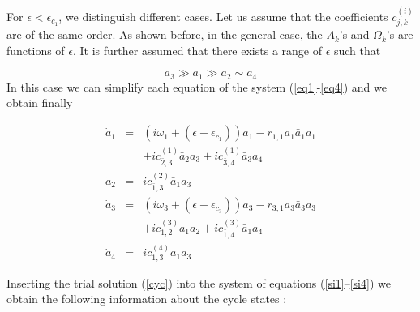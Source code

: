 For $\epsilon<\epsilon_{c_1}$, we distinguish different cases.
Let us assume that the coefficients $c^{(i)}_{j,k}$ are of the same order.
As shown before, in the general case, the $A_k$'s and $\Omega_k$'s
are functions of $\epsilon$.
It is further assumed that there exists a range of
$\epsilon$ such that 

\begin{equation}\label{order}
a_3\gg a_1 \gg a_2 \sim a_4
\end{equation}
In this case we can simplify each equation of the system 
(\ref{eq1}-\ref{eq4})
and we obtain finally



\begin{eqnarray}
\dot{a}_1&=&(i\omega_1+(\epsilon-\epsilon_{c_1}))a_1-r_{1,1}a_1\bar{a}_1a_1\nonumber\\
&&+ic^{(1)}_{\bar{2},3}\bar{a}_2{a}_3+ic^{(1)}_{\bar{3},4}\bar{a}_3a_4\label{si1}\\
\dot{a}_2&=&ic^{(2)}_{\bar{1},3}\bar{a}_1{a}_3\label{si2}\\
\dot{a}_3&=&(i\omega_3+(\epsilon-\epsilon_{c_3}))a_3-r_{3,1}a_3\bar{a}_3a_3\nonumber\\
&&+ic^{(3)}_{1,2}a_1a_2+ic^{(3)}_{\bar{1},4}\bar{a}_1a_4\label{si3}\\
\dot{a}_4&=&ic^{(4)}_{1,3}a_1a_3\label{si4}
\end{eqnarray}

Inserting the trial solution (\ref{cyc}) into 
the system of equations (\ref{si1}--\ref{si4}) we obtain the following
information about the cycle states :

